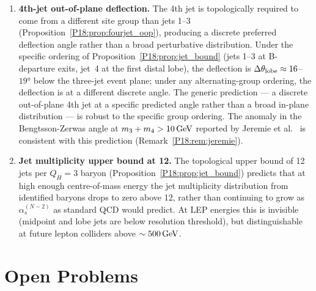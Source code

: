 \documentclass[11pt,a4paper]{article}
\theoremstyle{definition}\newtheorem{definition}[theorem]{Definition}
\theoremstyle{remark}
\newcommand{\QH}{Q_H}
\begin{document}
\begin{enumerate}[leftmargin=2em,label=\textbf{P\arabic*.}]
\item \textbf{4th-jet out-of-plane deflection.}
The 4th jet is topologically required to come from a different
site group than jets 1--3
(Proposition~\ref{P18:prop:fourjet_oop}), producing a discrete
preferred deflection angle rather than a broad perturbative
distribution.  Under the specific ordering of
Proposition~\ref{P18:prop:jet_bound} (jets 1--3 at B-departure
exits, jet~4 at the first distal lobe), the deflection is
$\Delta\theta_{\rm lobe}\approx16$--$19°$ below the three-jet
event plane; under any alternating-group ordering, the
deflection is at a different discrete angle.  The generic
prediction --- a discrete out-of-plane 4th jet at a specific
predicted angle rather than a broad in-plane distribution ---
is robust to the specific group ordering.  The anomaly in the
Bengtsson-Zerwas angle at $m_3+m_4>10\,{\rm GeV}$ reported by
Jeremie et al.~\cite{Jeremie2006} is consistent with this
prediction (Remark~\ref{P18:rem:jeremie}).

\item \textbf{Jet multiplicity upper bound at 12.}
The topological upper bound of 12 jets per $\QH=3$ baryon
(Proposition~\ref{P18:prop:jet_bound}) predicts that at high enough
centre-of-mass energy the jet multiplicity distribution from
identified baryons drops to zero above 12, rather than continuing
to grow as $\alpha_s^{(N-2)}$ as standard QCD would predict.
At LEP energies this is invisible (midpoint and lobe jets are
below resolution threshold), but distinguishable at future
lepton colliders above $\sim 500\,{\rm GeV}$.

\end{enumerate}

\section{Open Problems}
\label{P18:sec:open}
\end{document}
